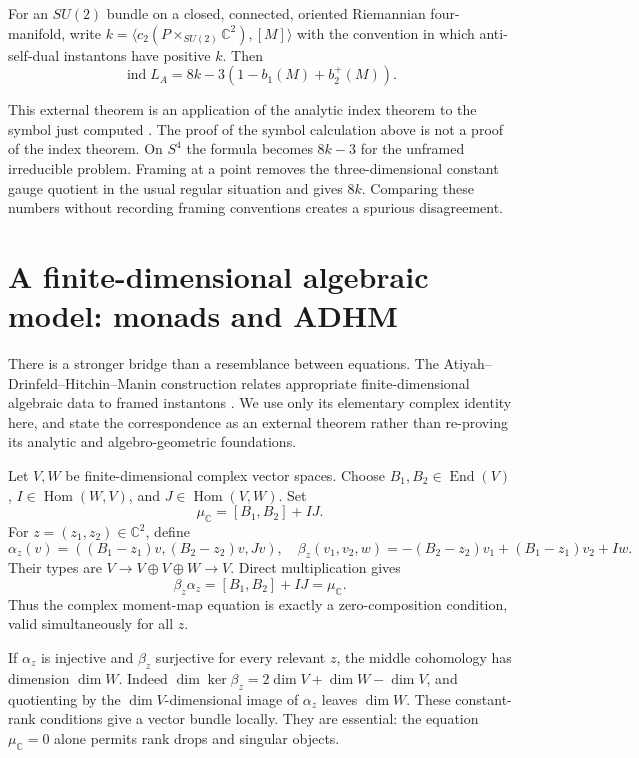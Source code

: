 \begin{theorem}
For an $SU(2)$ bundle on a closed, connected, oriented Riemannian four-manifold,
write $k=\langle c_2(P\times_{SU(2)}\mathbb C^2),[M]\rangle$ with
the convention in which anti-self-dual instantons have positive $k$.
Then
\begin{equation}
 \operatorname{ind}L_A=8k-3(1-b_1(M)+b_2^+(M)).
 \label{eq:asd-index}
\end{equation}
\end{theorem}

This external theorem is an application of the analytic index theorem to
the symbol just computed \cite{AHS1978}.  The proof of the symbol
calculation above is not a proof of the index theorem.  On $S^4$ the
formula becomes $8k-3$ for the unframed irreducible problem.  Framing at
a point removes the three-dimensional constant gauge quotient in the usual
regular situation and gives $8k$.  Comparing these numbers without
recording framing conventions creates a spurious disagreement.

\section{A finite-dimensional algebraic model: monads and ADHM}

There is a stronger bridge than a resemblance between equations.  The
Atiyah--Drinfeld--Hitchin--Manin construction relates appropriate
finite-dimensional algebraic data to framed instantons
\cite{ADHM1978}.  We use only its elementary complex identity here, and
state the correspondence as an external theorem rather than re-proving its
analytic and algebro-geometric foundations.

Let $V,W$ be finite-dimensional complex vector spaces.  Choose
$B_1,B_2\in\operatorname{End}(V)$,
$I\in\operatorname{Hom}(W,V)$, and
$J\in\operatorname{Hom}(V,W)$.  Set
\[
 \mu_{\mathbb C}=[B_1,B_2]+IJ.
\]
For $z=(z_1,z_2)\in\mathbb C^2$, define
\[
 \alpha_z(v)=((B_1-z_1)v,(B_2-z_2)v,Jv),
 \quad
 \beta_z(v_1,v_2,w)=-(B_2-z_2)v_1+(B_1-z_1)v_2+Iw.
\]
Their types are $V\to V\oplus V\oplus W\to V$.  Direct
multiplication gives
\begin{equation}
 \beta_z\alpha_z=[B_1,B_2]+IJ=\mu_{\mathbb C}.
 \label{eq:adhm-composition}
\end{equation}
Thus the complex moment-map equation is exactly a zero-composition
condition, valid simultaneously for all $z$.

If $\alpha_z$ is injective and $\beta_z$ surjective for every relevant
$z$, the middle cohomology has dimension $\dim W$.  Indeed
$\dim\ker\beta_z=2\dim V+\dim W-\dim V$, and quotienting
by the $\dim V$-dimensional image of $\alpha_z$ leaves $\dim W$.
These constant-rank conditions give a vector bundle locally.  They are
essential: the equation $\mu_{\mathbb C}=0$ alone permits rank drops
and singular objects.

